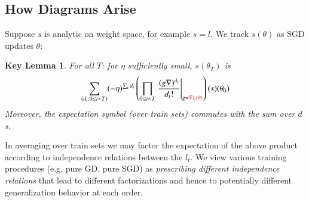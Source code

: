 \documentclass{article}
\theoremstyle{plain}
\newtheorem*{klem*}{Key Lemma}
\theoremstyle{definition}
\begin{document}
    \subsection{How Diagrams Arise}
        Suppose $s$ is analytic on weight space, for example $s=l$.
        We track $s(\theta)$ as SGD updates $\theta$: %
        \begin{klem*} %
            For all $T$: for $\eta$ sufficiently small, $s(\theta_T)$ is
            \begin{equation}\label{eq:dyson}
                \sum_{(d_t: 0\leq t<T)}
                (-\eta)^{\sum_t d_t}
                \left(
                    \prod_{0 \leq t < T}
                        \left.
                            \frac{(g \nabla)^{d_t}}{d_t!}
                        \right|_{g={\color{moor}\nabla l_t(\theta)}}
                \right)
                (s) (\theta_0)
            \end{equation}
            Moreover, the expectation symbol (over train sets) commutes with
            the sum over $d$s.
        \end{klem*}
        In averaging over train sets we may factor the expectation of the above
        product according to independence relations between the $l_t$.  We view
        various training procedures (e.g. pure GD, pure SGD) as
        \emph{prescribing different independence relations} that lead to
        different factorizations and hence to potentially different
        generalization behavior at each order.
    
\end{document}
